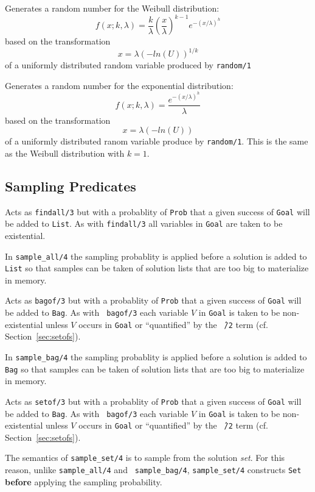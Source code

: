 \begin{description}
%
Generates a random number for the Weibull distribution:
\[
  f(x;k,\lambda) = \frac{k}{\lambda}(\frac{x}{\lambda})^{k-1}e^{-(x/\lambda)^h}
\]
based on the transformation
\[
  x = \lambda(-ln(U))^{1/k}
\]
of a uniformly distributed random variable produced by {\tt random/1}

%
Generates a random number for the exponential distribution:
\[
  f(x;k,\lambda) = \frac{e^{-(x/\lambda)^h}}{\lambda}
\]
based on the transformation
\[
  x = \lambda(-ln(U))
\]
of a uniformly distributed ranom variable produce by {\tt random/1}.
This is the same as the Weibull distribution with $k = 1$.

\end{description}

\subsection{Sampling Predicates} \label{sec:sample-aggrs}

\begin{description}
  Acts as {\tt findall/3} but with a probablity of {\tt Prob} that a
  given success of {\tt Goal} will be added to {\tt List}. As with
  {\tt findall/3} all variables in {\tt Goal} are taken to be
  existential.

  In {\tt sample\_all/4} the sampling probablity is applied before a
  solution is added to {\tt List} so that samples can be taken of
  solution lists that are too big to materialize in memory.
  
  Acts as {\tt bagof/3} but with a probablity of {\tt Prob} that a
  given success of {\tt Goal} will be added to {\tt Bag}. As with {\tt
    bagof/3} each variable $V$ in {\tt Goal} is taken to be
  non-existential unless $V$ occurs in {\tt Goal} or ``quantified'' by
  the {\tt \^\ /2} term (cf. Section~\ref{sec:setofs}).

  In {\tt sample\_bag/4} the sampling probablity is applied before a
  solution is added to {\tt Bag} so that samples can be taken of
  solution lists that are too big to materialize in memory.
  
  Acts as {\tt setof/3} but with a probablity of {\tt Prob} that a
  given success of {\tt Goal} will be added to {\tt Bag}. As with {\tt
    bagof/3} each variable $V$ in {\tt Goal} is taken to be
  non-existential unless $V$ occurs in {\tt Goal} or ``quantified'' by
  the {\tt \^\ /2} term (cf. Section~\ref{sec:setofs}).

  The semantics of {\tt sample\_set/4} is to sample from the solution
  {\em set}.  For this reason, unlike {\tt sample\_all/4} and {\tt
    sample\_bag/4}, {\tt sample\_set/4} constructs {\tt Set} {\bf
    before} applying the sampling probability.
\end{description}

